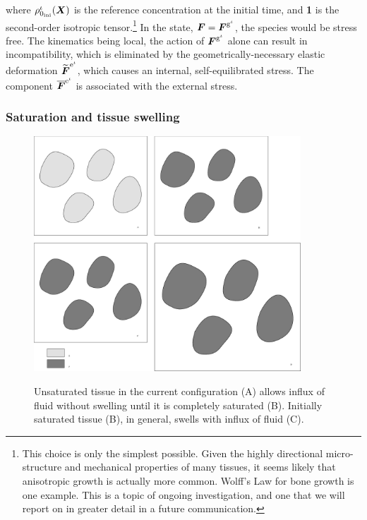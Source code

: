 \noindent where
$\rho_{0_{\mathrm{ini}}}^\iota(\mbox{\boldmath$ X$})$ is the reference concentration at the
initial time, and {\bf 1} is the second-order isotropic
tensor.\footnote{This choice is only the simplest possible. Given the
  highly directional micro-structure and mechanical properties of many
  tissues, it seems likely that anisotropic growth is actually 
  more common. Wolff's Law for bone growth is one example. This is a
  topic of ongoing investigation, and one that we will report on in
  greater detail in a future communication.} In 
the state, $\mbox{\boldmath$ F$} = \mbox{\boldmath$ F$}^{\mathrm{g}^\iota}$, the species would be stress
free. The kinematics being local, the
action of $\mbox{\boldmath$ F$}^{\mathrm{g}^\iota}$ alone can result in
incompatibility, which is eliminated by the geometrically-necessary
elastic deformation
$\widetilde{\mbox{\boldmath$ F$}}^{\mathrm{e}^{\mathrm{\iota}}}$, which causes an
internal, self-equilibrated stress. The component
$\overline{\mbox{\boldmath$ F$}}^{\mathrm{e}^\iota}$ is associated with the external stress.

\subsubsection{Saturation and tissue swelling}\label{satswel}

\begin{figure}[ht]
\centering 
{\includegraphics[width=10.00cm]{images/composite.eps}}

\caption{Unsaturated tissue in the current configuration (A) allows
  influx of fluid 
  without swelling until it is completely saturated (B). Initially
  saturated tissue (B), in general, swells with influx of fluid (C).}

\label{satswelfig}
\end{figure}


